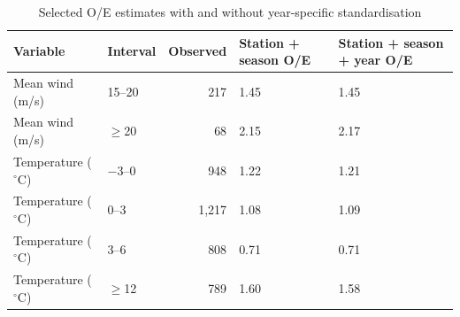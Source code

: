 \begin{table}[H]
\centering
\footnotesize
\caption{Selected O/E estimates with and without year-specific standardisation}
\label{tab:year-oe}
\begin{tabularx}{\textwidth}{L{0.17\textwidth}L{0.09\textwidth}rL{0.27\textwidth}X}
\toprule
Variable & Interval & Observed & Station + season O/E & Station + season + year O/E \\
\midrule
Mean wind (m/s) & 15--20 & 217 & 1.45 & 1.45 \\ \grayhline
Mean wind (m/s) & $\geq$20 & 68 & 2.15 & 2.17 \\ \grayhline
Temperature ($^{\circ}$C) & $-3$--0 & 948 & 1.22 & 1.21 \\ \grayhline
Temperature ($^{\circ}$C) & 0--3 & 1,217 & 1.08 & 1.09 \\ \grayhline
Temperature ($^{\circ}$C) & 3--6 & 808 & 0.71 & 0.71 \\ \grayhline
Temperature ($^{\circ}$C) & $\geq$12 & 789 & 1.60 & 1.58 \\
\bottomrule
\end{tabularx}
\end{table}
